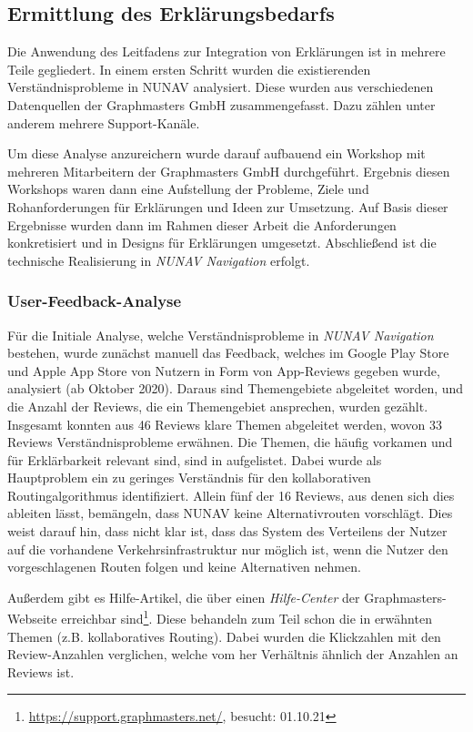 \subsection{Ermittlung des Erklärungsbedarfs}
\label{sec:explanation_demand_generation}

Die Anwendung des Leitfadens zur Integration von Erklärungen ist in mehrere Teile gegliedert. In einem ersten Schritt wurden die existierenden Verständnisprobleme in NUNAV analysiert. Diese wurden aus verschiedenen Datenquellen der Graphmasters GmbH zusammengefasst. Dazu zählen unter anderem mehrere Support-Kanäle.

Um diese Analyse anzureichern wurde darauf aufbauend ein Workshop mit mehreren Mitarbeitern der Graphmasters GmbH durchgeführt. Ergebnis diesen Workshops waren dann eine Aufstellung der Probleme, Ziele und Rohanforderungen für Erklärungen und Ideen zur Umsetzung. Auf Basis dieser Ergebnisse wurden dann im Rahmen dieser Arbeit die Anforderungen konkretisiert und in Designs für Erklärungen umgesetzt. Abschließend ist die technische Realisierung in \textit{NUNAV Navigation} erfolgt.

\subsubsection{User-Feedback-Analyse}

Für die Initiale Analyse, welche Verständnisprobleme in \textit{NUNAV Navigation} bestehen, wurde zunächst manuell das Feedback, welches im Google Play Store und Apple App Store von Nutzern in Form von App-Reviews gegeben wurde, analysiert (ab Oktober 2020). Daraus sind Themengebiete abgeleitet worden, und die Anzahl der Reviews, die ein Themengebiet ansprechen, wurden gezählt. Insgesamt konnten aus 46 Reviews klare Themen abgeleitet werden, wovon 33 Reviews Verständnisprobleme erwähnen. Die Themen, die häufig vorkamen und für Erklärbarkeit relevant sind, sind in  aufgelistet. Dabei wurde als Hauptproblem ein zu geringes Verständnis für den kollaborativen Routingalgorithmus identifiziert. Allein fünf der 16 Reviews, aus denen sich dies ableiten lässt, bemängeln, dass NUNAV keine Alternativrouten vorschlägt. Dies weist darauf hin, dass nicht klar ist, dass das System des Verteilens der Nutzer auf die vorhandene Verkehrsinfrastruktur nur möglich ist, wenn die Nutzer den vorgeschlagenen Routen folgen und keine Alternativen nehmen.

Außerdem gibt es Hilfe-Artikel, die über einen \textit{Hilfe-Center} der Graphmasters-Webseite erreichbar sind\footnote{\url{https://support.graphmasters.net/}, besucht: 01.10.21}. Diese behandeln zum Teil schon die in  erwähnten Themen (z.B. kollaboratives Routing). Dabei wurden die Klickzahlen mit den Review-Anzahlen verglichen, welche vom her Verhältnis ähnlich der Anzahlen an Reviews ist.

